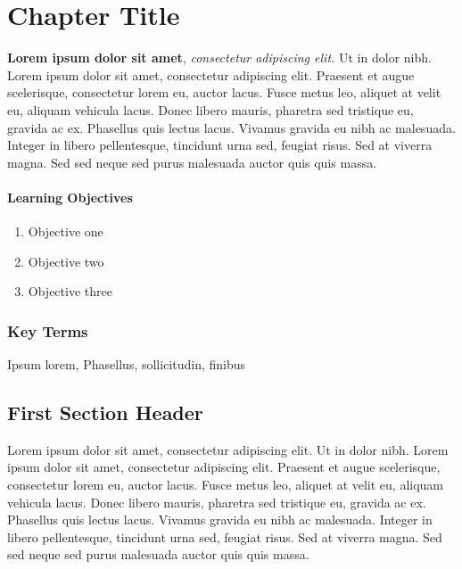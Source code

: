 \documentclass[
]{book}
\providecommand{\tightlist}{%
  \setlength{\itemsep}{0pt}\setlength{\parskip}{0pt}}
\begin{document}
\hypertarget{chapter-template}{%
\chapter{Chapter Title}\label{chapter-template}}

\textbf{Lorem ipsum dolor sit amet}, \emph{consectetur adipiscing elit.} Ut in dolor nibh. Lorem ipsum dolor sit amet, consectetur adipiscing elit. Praesent et augue scelerisque, consectetur lorem eu, auctor lacus. Fusce metus leo, aliquet at velit eu, aliquam vehicula lacus. Donec libero mauris, pharetra sed tristique eu, gravida ac ex. Phasellus quis lectus lacus. Vivamus gravida eu nibh ac malesuada. Integer in libero pellentesque, tincidunt urna sed, feugiat risus. Sed at viverra magna. Sed sed neque sed purus malesuada auctor quis quis massa.

\hypertarget{learning-objectives-1}{%
\subsubsection*{Learning Objectives}\label{learning-objectives-1}}

\begin{enumerate}
\def\labelenumi{\arabic{enumi}.}
\tightlist
\item
  Objective one
\item
  Objective two
\item
  Objective three
\end{enumerate}

\hypertarget{key-terms-1}{%
\subsection*{Key Terms}\label{key-terms-1}}

Ipsum lorem, Phasellus, sollicitudin, finibus

\hypertarget{first-section-header}{%
\section{First Section Header}\label{first-section-header}}

Lorem ipsum dolor sit amet, consectetur adipiscing elit. Ut in dolor nibh. Lorem ipsum dolor sit amet, consectetur adipiscing elit. Praesent et augue scelerisque, consectetur lorem eu, auctor lacus. Fusce metus leo, aliquet at velit eu, aliquam vehicula lacus. Donec libero mauris, pharetra sed tristique eu, gravida ac ex. Phasellus quis lectus lacus. Vivamus gravida eu nibh ac malesuada. Integer in libero pellentesque, tincidunt urna sed, feugiat risus. Sed at viverra magna. Sed sed neque sed purus malesuada auctor quis quis massa.
\end{document}
